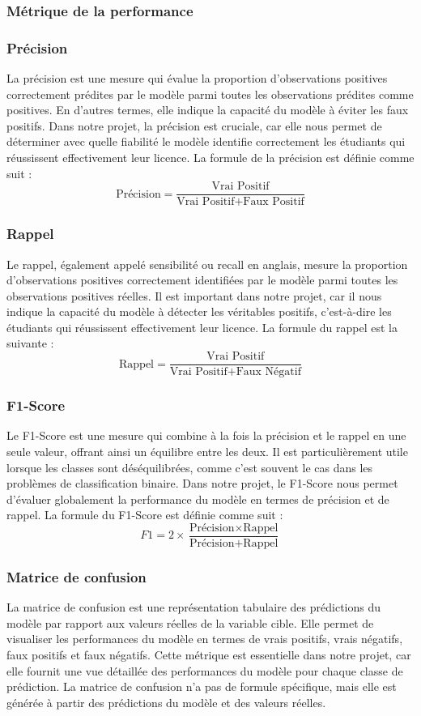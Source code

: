 \subsubsection{Métrique de la performance}
\subsubsection*{Précision} La précision est une mesure qui évalue la proportion d'observations positives correctement prédites par le modèle parmi toutes les observations prédites comme positives. En d'autres termes, elle indique la capacité du modèle à éviter les faux positifs. Dans notre projet, la précision est cruciale, car elle nous permet de déterminer avec quelle fiabilité le modèle identifie correctement les étudiants qui réussissent effectivement leur licence. La formule de la précision est définie comme suit : \[ \text{Précision} = \frac{\text{Vrai\ Positif}}{\text{Vrai\ Positif} + \text{Faux\ Positif}} \]

\subsubsection*{Rappel} Le rappel, également appelé sensibilité ou recall en anglais, mesure la proportion d'observations positives correctement identifiées par le modèle parmi toutes les observations positives réelles. Il est important dans notre projet, car il nous indique la capacité du modèle à détecter les véritables positifs, c'est-à-dire les étudiants qui réussissent effectivement leur licence. La formule du rappel est la suivante : \[ \text{Rappel} = \frac{\text{Vrai\ Positif}}{\text{Vrai\ Positif} + \text{Faux\ Négatif}} \]

\subsubsection*{F1-Score}
Le F1-Score est une mesure qui combine à la fois la précision et le rappel en une seule valeur, offrant ainsi un équilibre entre les deux. Il est particulièrement utile lorsque les classes sont déséquilibrées, comme c'est souvent le cas dans les problèmes de classification binaire. Dans notre projet, le F1-Score nous permet d'évaluer globalement la performance du modèle en termes de précision et de rappel. La formule du F1-Score est définie comme suit :
\[ F1 = 2 \times \frac{\text{Précision} \times \text{Rappel}}{\text{Précision} + \text{Rappel}} \]

\subsubsection*{Matrice de confusion}
La matrice de confusion est une représentation tabulaire des prédictions du modèle par rapport aux valeurs réelles de la variable cible. Elle permet de visualiser les performances du modèle en termes de vrais positifs, vrais négatifs, faux positifs et faux négatifs. Cette métrique est essentielle dans notre projet, car elle fournit une vue détaillée des performances du modèle pour chaque classe de prédiction. La matrice de confusion n'a pas de formule spécifique, mais elle est générée à partir des prédictions du modèle et des valeurs réelles.

